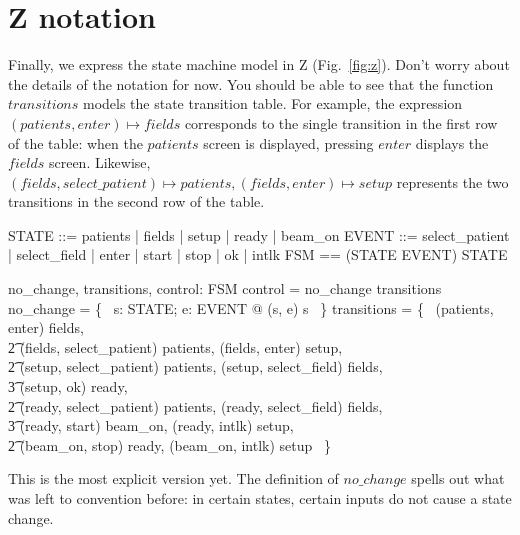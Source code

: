 \section*{Z notation}

Finally, we express the state machine model in Z (Fig.~\ref{fig:z}).
Don't worry about the details of the notation for now.  You should be
able to see that the function $transitions$ models the state
transition table.   For example, the expression 
\mbox{$(patients,enter) \mapsto fields$} corresponds to the single
transition in the first row of the
table: when the $patients$ screen is displayed, pressing $enter$
displays the $fields$ screen.  Likewise, 
\mbox{$(fields, select\_patient) \mapsto patients,(fields, enter) \mapsto setup$}
represents the two transitions in the second row of the table.

\begin{zed}
        STATE ::= patients | fields | setup | ready | beam\_on
\also
 EVENT ::= select\_patient | select\_field | enter | start | stop | ok | intlk
\also
        FSM == (STATE \cross EVENT) \pfun STATE
\end{zed}

\begin{axdef}
        no\_change, transitions, control: FSM
\where
        control = no\_change \oplus transitions
\also
        no\_change = \{~ s: STATE; e: EVENT @ (s, e) \mapsto s ~\}
\also
        transitions = \{~ (patients, enter) \mapsto fields, \\
\also
\t2             (fields, select\_patient) \mapsto patients,
                        (fields, enter) \mapsto setup, \\
\also
\t2             (setup, select\_patient) \mapsto patients,
                        (setup, select\_field) \mapsto fields, \\
\t3			(setup, ok) \mapsto ready, \\
\also
\t2             (ready, select\_patient) \mapsto patients,
                        (ready, select\_field) \mapsto fields, \\
\t3			(ready, start) \mapsto beam\_on, 
			(ready, intlk) \mapsto setup, \\
\also
\t2             (beam\_on, stop) \mapsto ready, 
                        (beam\_on, intlk) \mapsto setup ~\}
\end{axdef}

This is the most explicit version yet. The definition of $no\_change$ spells
out what was left to convention before: in certain states, certain inputs do
not cause a state change.

